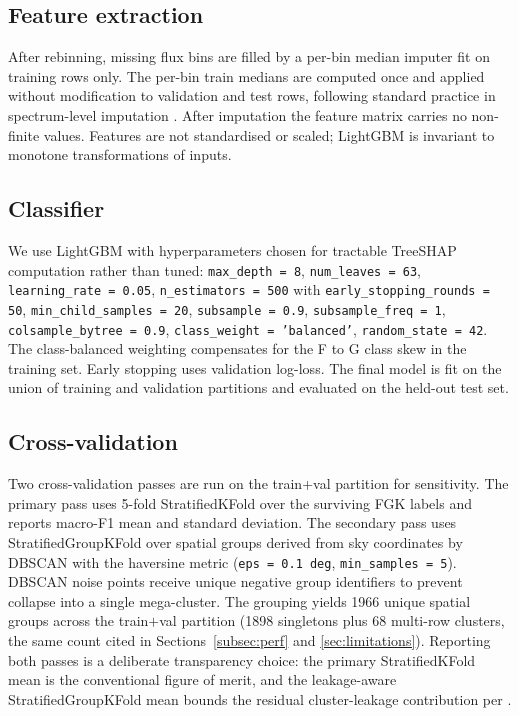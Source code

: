 \documentclass[11pt,a4paper]{article}
\begin{document}
\subsection{Feature extraction}

After rebinning, missing flux bins are filled by a per-bin median imputer fit on training rows only. The per-bin train medians are computed once and applied without modification to validation and test rows, following standard practice in spectrum-level imputation \citep{2015ApJ...808...16N,2018MNRAS.475.2978F}. After imputation the feature matrix carries no non-finite values. Features are not standardised or scaled; LightGBM is invariant to monotone transformations of inputs.

\subsection{Classifier}

\begin{sloppypar}
We use LightGBM \citep{Ke2017LightGBM} with hyperparameters chosen for tractable TreeSHAP computation rather than tuned: \texttt{max\_depth = 8}, \texttt{num\_leaves = 63}, \texttt{learning\_rate = 0.05}, \texttt{n\_estimators = 500} with \texttt{early\_stopping\_rounds = 50}, \texttt{min\_child\_samples = 20}, \texttt{subsample = 0.9}, \texttt{subsample\_freq = 1}, \texttt{colsample\_bytree = 0.9}, \texttt{class\_weight = 'balanced'}, \texttt{random\_state = 42}. The class-balanced weighting compensates for the F to G class skew in the training set. Early stopping uses validation log-loss. The final model is fit on the union of training and validation partitions and evaluated on the held-out test set.
\end{sloppypar}

\subsection{Cross-validation}
\label{subsec:cv}

Two cross-validation passes are run on the train+val partition for sensitivity. The primary pass uses 5-fold StratifiedKFold over the surviving FGK labels and reports macro-F1 mean and standard deviation. The secondary pass uses StratifiedGroupKFold over spatial groups derived from sky coordinates by DBSCAN with the haversine metric (\texttt{eps = 0.1 deg}, \texttt{min\_samples = 5}). DBSCAN noise points receive unique negative group identifiers to prevent collapse into a single mega-cluster. The grouping yields 1966 unique spatial groups across the train$+$val partition (1898 singletons plus 68 multi-row clusters, the same count cited in Sections~\ref{subsec:perf} and \ref{sec:limitations}). Reporting both passes is a deliberate transparency choice: the primary StratifiedKFold mean is the conventional figure of merit, and the leakage-aware StratifiedGroupKFold mean bounds the residual cluster-leakage contribution per \citet{2019MNRAS.486.2075B}.
\end{document}
